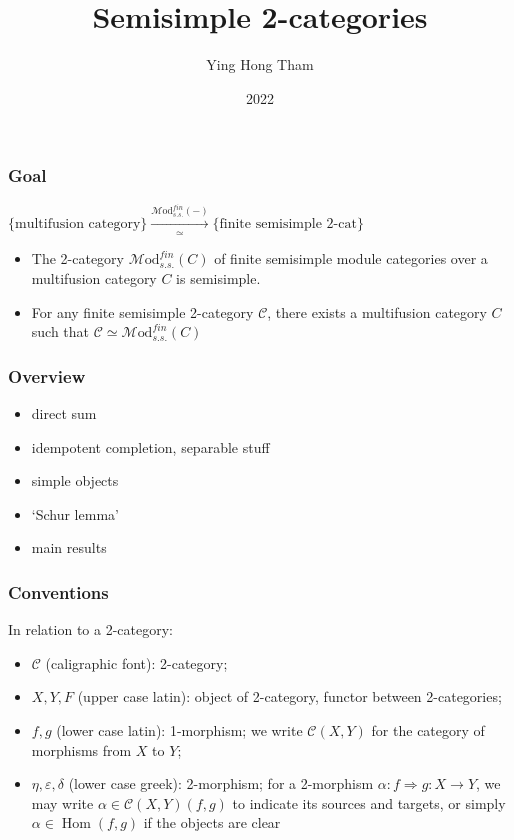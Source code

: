 \documentclass{beamer}
\title{Semisimple 2-categories}
\author{Ying Hong Tham}
\institute{UHH}
\date{2022}
\newcommand{\veps}{{\varepsilon}}
\DeclareMathOperator{\Hom}{Hom} %
\newcommand{\cC}{{\mathcal{C}}}
\newcommand{\Mod}{{\mathcal{M}\textrm{od}}}
\begin{document}
\frame{\titlepage}

\begin{frame}
\frametitle{Goal}
$\{\text{multifusion category}\}
\xrightarrow[\simeq]{\Mod_{s.s.}^{fin}(-)}
\{\text{finite semisimple 2-cat}\}$
\\

\begin{itemize}
\item The 2-category $\Mod_{s.s.}^{fin}(C)$
of finite semisimple module categories
over a multifusion category $C$
is semisimple.

\item For any finite semisimple 2-category $\cC$,
there exists a multifusion category $C$ such that
$\cC \simeq \Mod_{s.s.}^{fin}(C)$
\end{itemize}
\end{frame}

\begin{frame}
\frametitle{Overview}

\begin{itemize}
\item direct sum
\pause
\item idempotent completion, separable stuff
\pause
\item simple objects
\pause
\item `Schur lemma'
\pause
\item main results
\end{itemize}
\end{frame}

\begin{frame}
\frametitle{Conventions}
In relation to a 2-category:
\begin{itemize}
\item $\cC$ (caligraphic font): 2-category;

\item $X,Y,F$ (upper case latin): object of 2-category,
	functor between 2-categories;

\item $f,g$ (lower case latin): 1-morphism;
	we write $\cC(X,Y)$ for the category of morphisms
	from $X$ to $Y$;

\item $\eta,\veps,\delta$ (lower case greek): 2-morphism;
	for a 2-morphism $\alpha: f \Rightarrow g: X \to Y$,
	we may write $\alpha \in \cC(X,Y)(f,g)$
	to indicate its sources and targets,
	or simply $\alpha \in \Hom(f,g)$ if the objects are clear
\end{itemize}

\end{frame}
\end{document}
